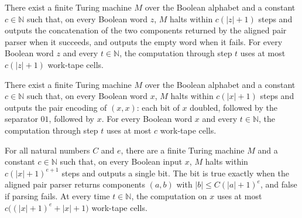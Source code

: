 \begin{theorem}
\label{Turing.FinTM.computesFunInTime_pairConcat_spaceUsed}
\leanok
{}
There exist a finite Turing machine $M$ over the Boolean alphabet and a constant
$c\in\mathbb{N}$ such that, on every Boolean word $z$, $M$ halts within $c(|z|+1)$ steps
and outputs the concatenation of the two components returned by the aligned pair parser
when it succeeds, and outputs the empty word when it fails. For every Boolean word $z$
and every $t\in\mathbb{N}$, the computation through step $t$ uses at most $c(|z|+1)$
work-tape cells.
\end{theorem}

\begin{theorem}
\label{Turing.FinTM.computesFunInTime_pairDup_spaceUsed}
\leanok
{}
There exist a finite Turing machine $M$ over the Boolean alphabet and a constant
$c\in\mathbb{N}$ such that, on every Boolean word $x$, $M$ halts within $c(|x|+1)$ steps
and outputs the pair encoding of $(x,x)$: each bit of $x$ doubled, followed by the
separator $01$, followed by $x$. For every Boolean word $x$ and every $t\in\mathbb{N}$,
the computation through step $t$ uses at most $c$ work-tape cells.
\end{theorem}

\begin{theorem}
\label{Turing.FinTM.computesFunInTime_pairLenCheck_spaceUsed}
\leanok
{}
For all natural numbers $C$ and $e$, there are a finite Turing machine $M$ and a
constant $c\in\mathbb{N}$ such that, on every Boolean input $x$, $M$ halts within
$c(|x|+1)^{e+1}$ steps and outputs a single bit. The bit is true exactly when the
aligned pair parser returns components $(a,b)$ with $|b|\le C(|a|+1)^e$, and false if
parsing fails. At every time $t\in\mathbb{N}$, the computation on $x$ uses at most
$c\big((|x|+1)^e+|x|+1\big)$ work-tape cells.
\end{theorem}

